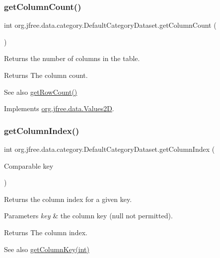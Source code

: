 \subsubsection{\texorpdfstring{get\+Column\+Count()}{getColumnCount()}}
{\footnotesize\ttfamily int org.\+jfree.\+data.\+category.\+Default\+Category\+Dataset.\+get\+Column\+Count (\begin{DoxyParamCaption}{ }\end{DoxyParamCaption})}

Returns the number of columns in the table.

\begin{DoxyReturn}{Returns}
The column count.
\end{DoxyReturn}
\begin{DoxySeeAlso}{See also}
\mbox{\hyperlink{classorg_1_1jfree_1_1data_1_1category_1_1_default_category_dataset_ae3c00007b8dd22c911f2cb6463508785}{get\+Row\+Count()}} 
\end{DoxySeeAlso}


Implements \mbox{\hyperlink{interfaceorg_1_1jfree_1_1data_1_1_values2_d_a212e32802dc2f32e0fb641740137c685}{org.\+jfree.\+data.\+Values2D}}.

\mbox{\label{classorg_1_1jfree_1_1data_1_1category_1_1_default_category_dataset_abd03d702aa033c675c043d04578fdd16}} 
\subsubsection{\texorpdfstring{get\+Column\+Index()}{getColumnIndex()}}
{\footnotesize\ttfamily int org.\+jfree.\+data.\+category.\+Default\+Category\+Dataset.\+get\+Column\+Index (\begin{DoxyParamCaption}\item[{Comparable}]{key }\end{DoxyParamCaption})}

Returns the column index for a given key.


\begin{DoxyParams}{Parameters}
{\em key} & the column key ({\ttfamily null} not permitted).\\
\hline
\end{DoxyParams}
\begin{DoxyReturn}{Returns}
The column index.
\end{DoxyReturn}
\begin{DoxySeeAlso}{See also}
\mbox{\hyperlink{classorg_1_1jfree_1_1data_1_1category_1_1_default_category_dataset_a830798ee850da00ea96dcf29f28c70e7}{get\+Column\+Key(int)}} 
\end{DoxySeeAlso}


